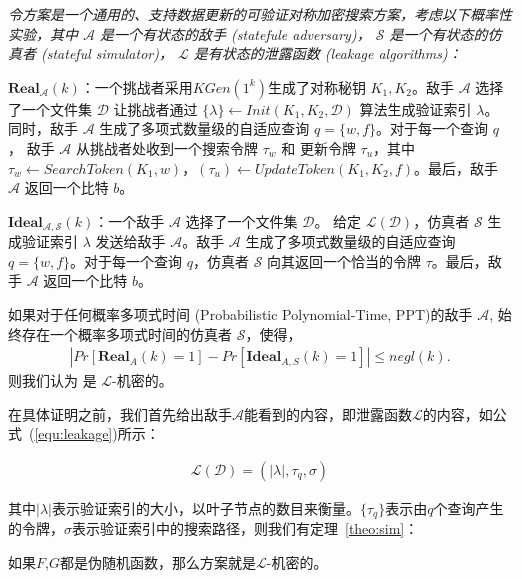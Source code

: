 \begin{definition}\label{def:sim}
  {\itshape
      令方案\single 是一个通用的、支持数据更新的可验证对称加密搜索方案，考虑以下概率性实验，其中 $\mathcal{A}$ 是一个有状态的敌手 (statefule adversary)， $\mathcal{S}$ 是一个有状态的仿真者 (stateful simulator)， $\mathcal{L}$ 是有状态的泄露函数 (leakage algorithms)：

      $\mathbf{Real}_\mathcal{A}(k)$：一个挑战者采用$KGen(1^k)$生成了对称秘钥 $K_1,K_2$。敌手 $\mathcal{A}$ 选择了一个文件集 $\mathcal{D}$ 让挑战者通过 $\{\lambda\} \leftarrow Init(K_1,K_2,\mathcal{D})$ 算法生成验证索引 $\lambda$。同时，敌手 $\mathcal{A}$ 生成了多项式数量级的自适应查询 $q = \{w,f\}$。对于每一个查询 $q$， 敌手 $\mathcal{A}$ 从挑战者处收到一个搜索令牌 $\tau_w$ 和 更新令牌 $\tau_u$，其中 $\tau_w \leftarrow SearchToken(K_1,w)$，$(\tau_u) \leftarrow UpdateToken(K_1,K_2,f)$。最后，敌手 $\mathcal{A}$ 返回一个比特 $b$。

      $\mathbf{Ideal}_\mathcal{A,S}(k)$：一个敌手 $\mathcal{A}$ 选择了一个文件集 $\mathcal{D}$。 给定 $\mathcal{L}(\mathcal{D})$，仿真者 $\mathcal{S}$ 生成验证索引 $\lambda$ 发送给敌手 $\mathcal{A}$。敌手 $\mathcal{A}$ 生成了多项式数量级的自适应查询 $q = \{w,f\}$。对于每一个查询 $q$，仿真者 $\mathcal{S}$ 向其返回一个恰当的令牌 $\tau$。最后，敌手 $\mathcal{A}$ 返回一个比特 $b$。

      如果对于任何概率多项式时间 (Probabilistic Polynomial-Time, PPT)的敌手 $\mathcal{A}$, 始终存在一个概率多项式时间的仿真者 $\mathcal{S}$，使得，
      \begin{align}
        \label{equ:sim}
        |Pr[\mathbf{Real}_A(k) = 1] - Pr[\mathbf{Ideal}_{A,S}(k) = 1]| \leq negl(k).
      \end{align}
      则我们认为 \single 是 $\mathcal{L}$-机密的。
  }
\end{definition}


在具体证明之前，我们首先给出敌手$\mathcal{A}$能看到的内容，即泄露函数$\mathcal{L}$的内容，如公式~(\ref{equ:leakage})所示：

\begin{align}\label{equ:leakage}
  \mathcal{L}(\mathcal{D})=(|\lambda|,{\tau}_q,{\sigma})
\end{align}

其中$|\lambda|$表示验证索引的大小，以叶子节点的数目来衡量。$\{\tau_q\}$表示由$q$个查询产生的令牌，$\sigma$表示验证索引中的搜索路径，则我们有定理~\ref{theo:sim}：

\begin{theorem}\label{theo:sim}
    如果$F$,$G$都是伪随机函数，那么方案\single 就是$\mathcal{L}$-机密的。
\end{theorem}

